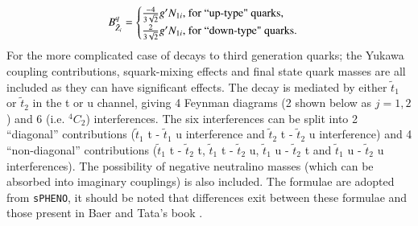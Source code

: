 \documentclass[final,3p,times]{elsarticle}
\begin{document}
\begin{equation}
B_{{\tilde{Z}_i}}^{q} = \begin{cases} 
						{-4 \over 3 \sqrt{2}} g'N_{1i}$, for ``up-type" quarks,$ \\
						{2 \over 3 \sqrt{2}} g' N_{1i}$, for ``down-type" quarks$.
                                              \end{cases}
\end{equation}
For the more complicated case of decays to third generation quarks; the Yukawa coupling contributions, squark-mixing effects and final state quark masses are all included as they can have significant effects. The decay is mediated by either $\tilde{t}_1$ or $\tilde{t}_2$ in the t or u channel, giving 4 Feynman diagrams (2 shown below as $j=1,2$) and 6 (i.e. $^4 C _2$) interferences. The six interferences can be split into 2 ``diagonal'' contributions ($\tilde{t}_1$ t - $\tilde{t}_1$ u interference and $\tilde{t}_2$ t - $\tilde{t}_2$ u interference) and 4 ``non-diagonal'' contributions ($\tilde{t}_1$ t - $\tilde{t}_2$ t, $\tilde{t}_1$ t - $\tilde{t}_2$ u, $\tilde{t}_1$ u - $\tilde{t}_2$ t and $\tilde{t}_1$ u - $\tilde{t}_2$ u interferences). The possibility of negative neutralino masses (which can be absorbed into imaginary couplings) is also included. The formulae are adopted from {\tt sPHENO}, it should be noted that differences exit between these formulae and those present in Baer and Tata's book \cite{TataBaer}.
\end{document}
